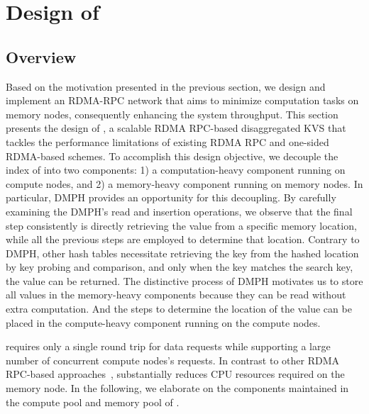 \vspace{-1ex}
\section{Design of \sys}
\label{sec:design}
\vspace{-.5ex}

\subsection{Overview}
\label{sec:design:overview}

Based on the motivation presented in the previous section, we design and implement an RDMA-RPC network that aims to minimize computation tasks on memory nodes, consequently enhancing the system throughput. 
This section presents the design of \sys, a scalable RDMA RPC-based disaggregated KVS that tackles the performance limitations of existing RDMA RPC and one-sided RDMA-based schemes. 
To accomplish this design objective, we decouple the index of \sys into two components: 1) a computation-heavy component running on compute nodes, and 2) a memory-heavy component running on memory nodes.
In particular, DMPH provides an opportunity for this decoupling. By carefully examining the DMPH's read and insertion operations, we observe that the final step consistently is directly retrieving the value from a specific memory location, while all the previous steps are employed to determine that location.
Contrary to DMPH, other hash tables necessitate retrieving the key from the hashed location by key probing and comparison, and only when the key matches the search key, the value can be returned. 
The distinctive process of DMPH motivates us to store all values in the memory-heavy components because they can be read without extra computation. And the steps to determine the location of the value can be placed in the compute-heavy component running on the compute nodes.

\sys requires only a single round trip for data requests while supporting a large number of concurrent compute nodes's requests. In contrast to other RDMA RPC-based approaches~\cite{fasst,herd}, \sys substantially reduces CPU resources required on the memory node.
In the following, we elaborate on the components maintained in the compute pool and memory pool of \sys.

